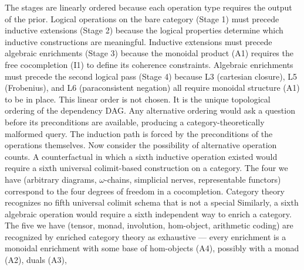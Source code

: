 \documentclass[12pt,a4paper]{article}
\makeatletter
\renewcommand{\_}{\ig@origunderscore\discretionary{}{}{}}
\makeatother
\begin{document}
\begin{center}


\end{center}

The stages are linearly ordered because each operation type requires the output of the prior. Logical operations on the
bare category (Stage 1) must precede inductive extensions (Stage 2) because the logical properties determine which
inductive constructions are meaningful. Inductive extensions must precede algebraic enrichments
(Stage 3) because the
monoidal product (A1) requires the free cocompletion (I1) to define its coherence constraints. Algebraic enrichments
must precede the second logical pass (Stage 4) because L3 (cartesian closure), L5 (Frobenius), and L6 (paraconsistent
negation) all require monoidal structure (A1) to be in place.
This linear order is not chosen. It is the unique topological ordering of the dependency DAG. Any alternative ordering
would ask a question before its preconditions are available, producing a category-theoretically malformed query. The
induction path is forced by the preconditions of the operations themselves.
Now consider the possibility of alternative operation counts. A counterfactual in which a sixth inductive operation
existed would require a sixth universal colimit-based construction on a category. The four we have
(arbitrary diagrams,
$\omega$-chains, simplicial nerves, representable functors) correspond to the four degrees of freedom in a
cocompletion. Category theory recognizes no fifth universal colimit schema that is not a special
Similarly, a sixth algebraic operation would require a sixth independent way to enrich a category. The five we have
(tensor, monad, involution, hom-object, arithmetic coding) are recognized by enriched category theory as exhaustive ---
every enrichment is a monoidal enrichment with some base of hom-objects (A4), possibly with a monad
(A2), duals (A3),
\end{document}

